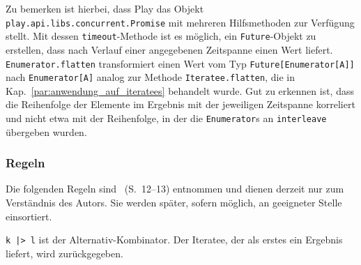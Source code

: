 \documentclass[draft=false
              ,paper=a4
              ,twoside=false
              ,fontsize=11pt
              ,headsepline
              ,BCOR10mm
              ,DIV11
              ]{scrbook}
\begin{document}
Zu bemerken ist hierbei, dass Play das Objekt \lstinline|play.api.libs.concurrent.Promise| mit mehreren Hilfsmethoden zur Verfügung stellt.
Mit dessen \lstinline|timeout|-Methode ist es möglich, ein \lstinline|Future|-Objekt zu erstellen, dass nach Verlauf einer angegebenen Zeitspanne einen Wert liefert.
\lstinline|Enumerator.flatten| transformiert einen Wert vom Typ \lstinline|Future[Enumerator[A]]| nach \lstinline|Enumerator[A]| analog zur Methode \lstinline|Iteratee.flatten|, die in Kap.~\ref{par:anwendung_auf_iteratees} behandelt wurde.
Gut zu erkennen ist, dass die Reihenfolge der Elemente im Ergebnis mit der jeweiligen Zeitspanne korreliert und nicht etwa mit der Reihenfolge, in der die \lstinline|Enumerator|s an \lstinline|interleave| übergeben wurden.




\subsubsection{Regeln} %
\label{ssub:regeln}

Die folgenden Regeln sind \citealt{kiselyov2012}~(S.~12--13) entnommen und dienen derzeit nur zum Verständnis des Autors.
Sie werden später, sofern möglich, an geeigneter Stelle einsortiert.

\lstinline!k |> l! ist der Alternativ-Kombinator. Der Iteratee, der als erstes ein Ergebnis liefert, wird zurückgegeben.
\end{document}
